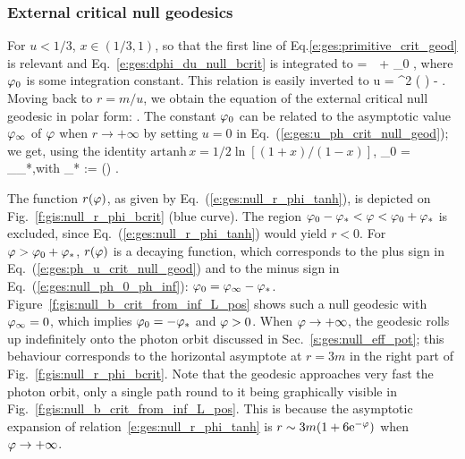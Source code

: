 \subsubsection{External critical null geodesics} \label{s:gis:extern_crit_geod}

For $u<1/3$, $x\in(1/3, 1)$, so that the first line of Eq.\eqref{e:ges:primitive_crit_geod}
is relevant and Eq.~\eqref{e:ges:dphi_du_null_bcrit} is integrated to
\be \label{e:ges:ph_u_crit_null_geod}
    \ph =  \,\,  + \ph_0 ,
\ee
where $\varphi_0$ is some integration constant. This relation is easily inverted
to
\be \label{e:ges:u_ph_crit_null_geod}
    u =   \tanh^2 \left( \right) -  .
\ee
Moving back to $r = m/u$, we obtain the equation of the external critical
null geodesic in polar form:
\be \label{e:ges:null_r_phi_tanh}
   .
\ee
The constant $\varphi_0$ can be related to the asymptotic value $\varphi_\infty$ of $\varphi$
when $r\to +\infty$ by setting $u=0$ in Eq.~(\ref{e:ges:u_ph_crit_null_geod});
we get, using the identity $\mathrm{artanh}\,  x = 1/2\ln[(1+x)/(1-x)]$,
\be \label{e:ges:null_ph_0_ph_inf}
    \ph_0 = \ph_\infty \pm \ph_*,\quad\mbox{with}\quad
    \ph_* := \ln\left(\right)
    .
\ee

The function $r(\varphi)$, as given by Eq.~(\ref{e:ges:null_r_phi_tanh}), is
depicted on Fig.~\ref{f:gis:null_r_phi_bcrit} (blue curve).
The region $\varphi_0-\varphi_* < \varphi < \varphi_0 + \varphi_*$ is excluded, since
Eq.~(\ref{e:ges:null_r_phi_tanh}) would yield $r<0$. For $\varphi > \varphi_0 + \varphi_*$,
$r(\varphi)$ is a decaying
function, which corresponds to the
plus sign in Eq.~(\ref{e:ges:ph_u_crit_null_geod}) and to the minus sign in
Eq.~(\ref{e:ges:null_ph_0_ph_inf}): $\varphi_0 = \varphi_\infty - \varphi_*$.
Figure~\ref{f:gis:null_b_crit_from_inf_L_pos} shows such a null geodesic with
$\varphi_\infty=0$, which implies $\varphi_0 = - \varphi_*$ and $\varphi>0$.
When $\varphi\to +\infty$, the geodesic rolls up indefinitely onto the photon
orbit discussed in Sec.~\ref{s:ges:null_eff_pot}; this
behaviour corresponds to the horizontal asymptote at $r=3m$ in
the right part of Fig.~\ref{f:gis:null_r_phi_bcrit}.
Note that the geodesic approaches very fast the photon orbit, only a single
path round to it being graphically visible in Fig.~\ref{f:gis:null_b_crit_from_inf_L_pos}.
This is because the asymptotic expansion of relation~\eqref{e:ges:null_r_phi_tanh} is
$r\sim 3m(1+ 6\mathrm{e}^{-\varphi})$ when $\varphi\to+\infty$.

